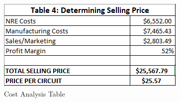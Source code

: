 

\begin{figure}[H]
	\centering
	\includegraphics[width=0.7\linewidth]{tablecost}
	\caption{Cost Analysis Table}
	\label{fig:tablecost}
\end{figure}



